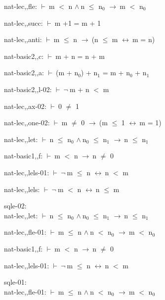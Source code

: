 \documentclass[a4paper]{article}
\newcommand{\Fol}{\mbox{$\vdash\ $}}
\newcommand{\Not}{\mbox{$\neg\ $}}
\newcommand{\And}{\mbox{$\wedge\ $}}
\newcommand{\Imp}{\mbox{$\rightarrow\ $}}
\newcommand{\Equiv}{\mbox{$\leftrightarrow\ $}}
\begin{document}
nat-lec,,fle: 
 \Fol m $<$ n \And n $\le$ $\mbox{n}_{0}$ \Imp m $<$ $\mbox{n}_{0}$



nat-lec,,succ: 
 \Fol m +1 = m + 1



nat-lec,,anti: 
 \Fol m $\le$ n \Imp (n $\le$ m \Equiv m = n)



nat-basic2,,c: 
 \Fol m + n = n + m



nat-basic2,,a: 
 \Fol (m + $\mbox{n}_{0}$) + $\mbox{n}_{1}$ = m + $\mbox{n}_{0}$ + $\mbox{n}_{1}$



nat-basic2,,l-02: 
 \Fol \Not m + n $<$ m



nat-lec,,ax-02: 
 \Fol 0 $\neq$ 1



nat-lec,,one-02: 
 \Fol m $\neq$ 0 \Imp (m $\le$ 1 \Equiv m = 1)



nat-lec,,let: 
 \Fol n $\le$ $\mbox{n}_{0}$ \And $\mbox{n}_{0}$ $\le$ $\mbox{n}_{1}$ \Imp n $\le$ $\mbox{n}_{1}$



nat-basic1,,f: 
 \Fol m $<$ n \Imp n $\neq$ 0



nat-lec,,lels-01: 
 \Fol \Not m $\le$ n \Equiv n $<$ m



nat-lec,,lels: 
 \Fol \Not m $<$ n \Equiv n $\le$ m



\bigskip

sqle-02:\\ nat-lec,,let: 
 \Fol n $\le$ $\mbox{n}_{0}$ \And $\mbox{n}_{0}$ $\le$ $\mbox{n}_{1}$ \Imp n $\le$ $\mbox{n}_{1}$



nat-lec,,fle-01: 
 \Fol m $\le$ n \And n $<$ $\mbox{n}_{0}$ \Imp m $<$ $\mbox{n}_{0}$



nat-basic1,,f: 
 \Fol m $<$ n \Imp n $\neq$ 0



nat-lec,,lels-01: 
 \Fol \Not m $\le$ n \Equiv n $<$ m



\bigskip

sqle-01:\\ nat-lec,,fle-01: 
 \Fol m $\le$ n \And n $<$ $\mbox{n}_{0}$ \Imp m $<$ $\mbox{n}_{0}$
\end{document}
